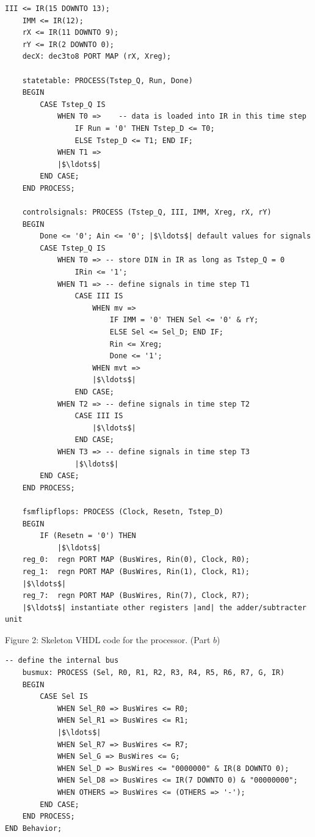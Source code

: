 \documentclass[epsfig,10pt,fullpage]{article}
\begin{document}
\begin{enumerate}
\begin{center}
\begin{minipage}[t]{15 cm}
\begin{lstlisting}[name=proc]
    III <= IR(15 DOWNTO 13);
    IMM <= IR(12);
    rX <= IR(11 DOWNTO 9);
    rY <= IR(2 DOWNTO 0);
    decX: dec3to8 PORT MAP (rX, Xreg);
    
    statetable: PROCESS(Tstep_Q, Run, Done)
    BEGIN
        CASE Tstep_Q IS
            WHEN T0 =>    -- data is loaded into IR in this time step
                IF Run = '0' THEN Tstep_D <= T0;
                ELSE Tstep_D <= T1; END IF;
            WHEN T1 =>
            |$\ldots$|
        END CASE;
    END PROCESS;

    controlsignals: PROCESS (Tstep_Q, III, IMM, Xreg, rX, rY)
    BEGIN
        Done <= '0'; Ain <= '0'; |$\ldots$| default values for signals
        CASE Tstep_Q IS
            WHEN T0 => -- store DIN in IR as long as Tstep_Q = 0
                IRin <= '1';
            WHEN T1 => -- define signals in time step T1
                CASE III IS
                    WHEN mv =>
                        IF IMM = '0' THEN Sel <= '0' & rY;
                        ELSE Sel <= Sel_D; END IF;
                        Rin <= Xreg;
                        Done <= '1';
                    WHEN mvt =>                         
                    |$\ldots$|
                END CASE;
            WHEN T2 => -- define signals in time step T2
                CASE III IS
                    |$\ldots$|
                END CASE;
            WHEN T3 => -- define signals in time step T3
                |$\ldots$|
        END CASE;
    END PROCESS;

    fsmflipflops: PROCESS (Clock, Resetn, Tstep_D)
    BEGIN
        IF (Resetn = '0') THEN
            |$\ldots$|
    reg_0:  regn PORT MAP (BusWires, Rin(0), Clock, R0);
    reg_1:  regn PORT MAP (BusWires, Rin(1), Clock, R1);
    |$\ldots$|
    reg_7:  regn PORT MAP (BusWires, Rin(7), Clock, R7);
    |$\ldots$| instantiate other registers |and| the adder/subtracter unit
\end{lstlisting}
\end{minipage}
\end{center}

\begin{center}
Figure 2: Skeleton VHDL code for the processor. (Part $b$)
\end{center}

\begin{center}
\begin{minipage}[t]{15 cm}
\begin{lstlisting}[name=proc]
    -- define the internal bus
    busmux: PROCESS (Sel, R0, R1, R2, R3, R4, R5, R6, R7, G, IR)
    BEGIN
        CASE Sel IS
            WHEN Sel_R0 => BusWires <= R0;
            WHEN Sel_R1 => BusWires <= R1;
            |$\ldots$|
            WHEN Sel_R7 => BusWires <= R7;
            WHEN Sel_G => BusWires <= G;
            WHEN Sel_D => BusWires <= "0000000" & IR(8 DOWNTO 0);
            WHEN Sel_D8 => BusWires <= IR(7 DOWNTO 0) & "00000000";
            WHEN OTHERS => BusWires <= (OTHERS => '-');
        END CASE;
    END PROCESS;   
END Behavior;


\end{lstlisting}
\end{minipage}
\end{center}
\end{enumerate}
\end{document}
